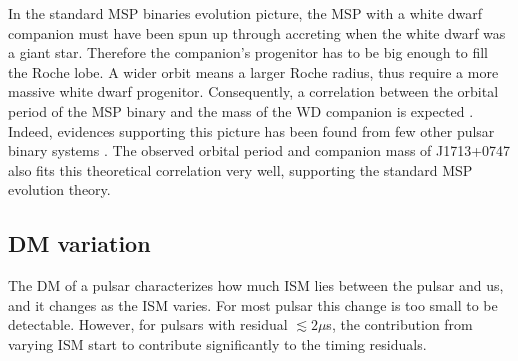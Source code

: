 In the standard MSP binaries evolution picture, the MSP with a white dwarf companion must have been spun up through
accreting when the white dwarf was a giant star. Therefore the 
companion's progenitor has to be big enough to fill the Roche lobe. A wider
orbit means a larger Roche radius, thus require a more massive white dwarf 
progenitor.
Consequently, a correlation between the orbital period
of the MSP binary and the mass of the WD companion is expected \citep{rpj+95, ts99a, prp02b, th14}. 
Indeed, evidences supporting this picture has been found from few other pulsar
binary systems \citep{vbb+01, ktr94}.  
The observed  orbital period and companion mass of J1713+0747 also fits this theoretical correlation very well, supporting the standard MSP evolution theory. %




\subsection{DM variation}
\label{sec:dmx}
The DM of a pulsar characterizes how much ISM lies
between the pulsar and us, and it changes as the ISM varies. For most pulsar
this change is too small to be detectable. However, for pulsars with residual
$\lesssim2\mu$s, the contribution from varying ISM start to contribute
significantly to the timing residuals. 

